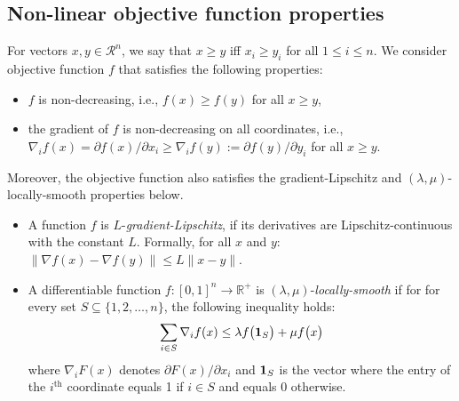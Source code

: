 \subsection{Non-linear objective function properties} \label{sec:f-properties}

For vectors $x, y \in \mathcal{R}^{n}$, we say that $x \geq y$ iff $x_{i} \geq y_{i}$ for all $1 \leq i \leq n$.
We consider objective function $f$ that satisfies the following properties:
\begin{itemize}
	\item $f$ is non-decreasing, i.e., $f(x) \geq f(y)$ for all $x \geq y$,
	\item the gradient of $f$ is non-decreasing on all coordinates, i.e., $\nabla_{i} f(x) = \partial f(x)/\partial x_{i} \geq \nabla_{i} f(y) := \partial f(y)/\partial y_{i}$ for all $x \geq y$.
\end{itemize}
%
Moreover, the objective function also satisfies the gradient-Lipschitz and $(\lambda,\mu)$-locally-smooth properties below.
\begin{itemize}
	\item A function $f$ is $L$-\emph{gradient-Lipschitz}, if its derivatives are Lipschitz-continuous with the constant $L$. 
		Formally, for all $x$ and $y$: $\|\nabla f(x) - \nabla f(y)\| \le L \|x - y\|$.
	\item A differentiable function $f: [0,1]^{n} \rightarrow \mathbb{R}^{+}$ is $(\lambda,\mu)$-\emph{locally-smooth}
   		 if for  for every set $S \subseteq \{1, 2, \ldots, n\}$, the following inequality holds:
    \begin{equation*}	\label{eq:min-local-smooth}
    \sum_{i \in S} \nabla_{i} f(x) \leq \lambda f\bigl( \mathbf{1}_{S} \bigr) + \mu f\bigl( x \bigr)
    \end{equation*}
    where $\nabla_{i} F(x)$ denotes $\partial F(x)/\partial x_{i}$ and $\mathbf{1}_{S}$ is the vector where the entry of the $i^{\text{th}}$ coordinate equals 1 if $i \in S$
    and equals 0 otherwise.
\end{itemize}

